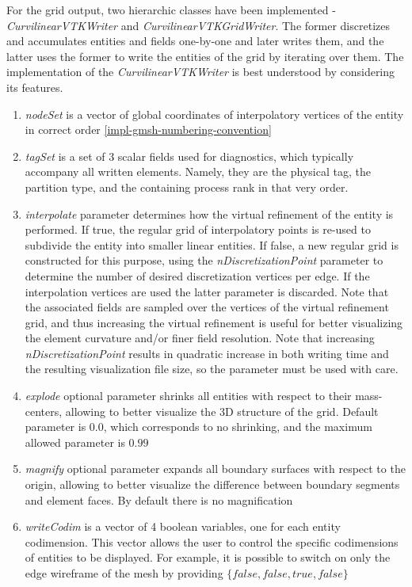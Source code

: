 
For the grid output, two hierarchic classes have been implemented - \textit{CurvilinearVTKWriter} and \textit{CurvilinearVTKGridWriter}. The former discretizes and accumulates entities and fields one-by-one and later writes them, and the latter uses the former to write the entities of the grid by iterating over them. The implementation of the \textit{CurvilinearVTKWriter} is best understood by considering its features.


\begin{enumerate}  
  \item \textit{nodeSet} is a vector of global coordinates of interpolatory vertices of the entity in correct order \ref{impl-gmsh-numbering-convention}
  \item \textit{tagSet} is a set of 3 scalar fields used for diagnostics, which typically accompany all written elements. Namely, they are the physical tag, the partition type, and the containing process rank in that very order. 
  \item \textit{interpolate} parameter determines how the virtual refinement of the entity is performed. If true, the regular grid of interpolatory points is re-used to subdivide the entity into smaller linear entities. If false, a new regular grid is constructed for this purpose, using the \textit{nDiscretizationPoint} parameter to determine the number of desired discretization vertices per edge. If the interpolation vertices are used the latter parameter is discarded. Note that the associated fields are sampled over the vertices of the virtual refinement grid, and thus increasing the virtual refinement is useful for better visualizing the element curvature and/or finer field resolution. Note that increasing \textit{nDiscretizationPoint} results in quadratic increase in both writing time and the resulting visualization file size, so the parameter must be used with care.
  \item \textit{explode} optional parameter shrinks all entities with respect to their mass-centers, allowing to better visualize the 3D structure of the grid. Default parameter is $0.0$, which corresponds to no shrinking, and the maximum allowed parameter is $0.99$
  \item \textit{magnify} optional parameter expands all boundary surfaces with respect to the origin, allowing to better visualize the difference between boundary segments and element faces. By default there is no magnification  
  \item \textit{writeCodim} is a vector of 4 boolean variables, one for each entity codimension. This vector allows the user to control the specific codimensions of entities to be displayed. For example, it is possible to switch on only the edge wireframe of the mesh by providing $\{ false, false, true, false \}$
\end{enumerate}


